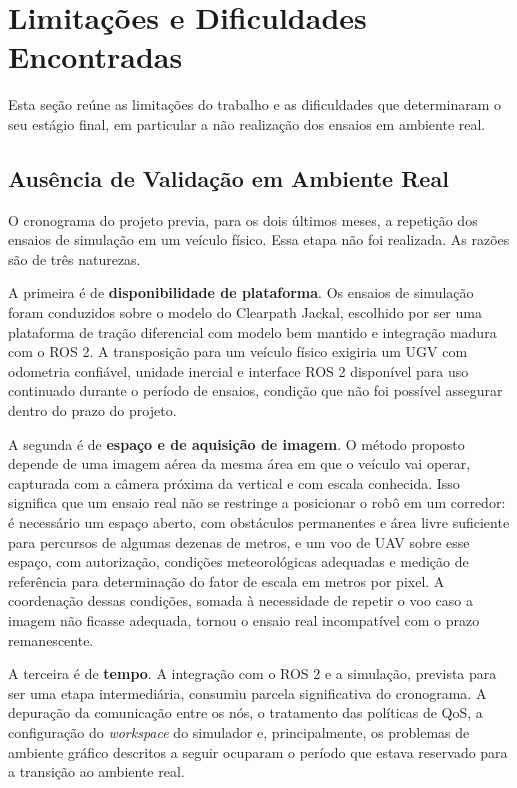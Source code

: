 \documentclass[
    12pt,
    openright,
    oneside,
    a4paper,
    english,
    brazil
]{abntex2}
\begin{document}
\section{Limitações e Dificuldades Encontradas}
\label{sec:limitacoes}

Esta seção reúne as limitações do trabalho e as dificuldades que determinaram o seu estágio final, em particular a não realização dos ensaios em ambiente real.

\subsection{Ausência de Validação em Ambiente Real}

O cronograma do projeto previa, para os dois últimos meses, a repetição dos ensaios de simulação em um veículo físico. Essa etapa não foi realizada. As razões são de três naturezas.

A primeira é de \textbf{disponibilidade de plataforma}. Os ensaios de simulação foram conduzidos sobre o modelo do Clearpath Jackal, escolhido por ser uma plataforma de tração diferencial com modelo bem mantido e integração madura com o ROS 2. A transposição para um veículo físico exigiria um UGV com odometria confiável, unidade inercial e interface ROS 2 disponível para uso continuado durante o período de ensaios, condição que não foi possível assegurar dentro do prazo do projeto.

A segunda é de \textbf{espaço e de aquisição de imagem}. O método proposto depende de uma imagem aérea da mesma área em que o veículo vai operar, capturada com a câmera próxima da vertical e com escala conhecida. Isso significa que um ensaio real não se restringe a posicionar o robô em um corredor: é necessário um espaço aberto, com obstáculos permanentes e área livre suficiente para percursos de algumas dezenas de metros, e um voo de UAV sobre esse espaço, com autorização, condições meteorológicas adequadas e medição de referência para determinação do fator de escala em metros por pixel. A coordenação dessas condições, somada à necessidade de repetir o voo caso a imagem não ficasse adequada, tornou o ensaio real incompatível com o prazo remanescente.

A terceira é de \textbf{tempo}. A integração com o ROS 2 e a simulação, prevista para ser uma etapa intermediária, consumiu parcela significativa do cronograma. A depuração da comunicação entre os nós, o tratamento das políticas de QoS, a configuração do \textit{workspace} do simulador e, principalmente, os problemas de ambiente gráfico descritos a seguir ocuparam o período que estava reservado para a transição ao ambiente real.
\end{document}
